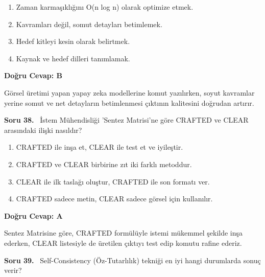 \documentclass[11pt,a4paper,openany]{book}
\begin{document}
\begin{enumerate}[label=\Alph*), leftmargin=25pt, topsep=4pt, itemsep=2pt]
        \item Zaman karmaşıklığını O(n log n) olarak optimize etmek.
        \item Kavramları değil, somut detayları betimlemek.
        \item Hedef kitleyi kesin olarak belirtmek.
        \item Kaynak ve hedef dilleri tanımlamak.
\end{enumerate}

\vspace{4pt}
\begin{tcolorbox}[title=Cevap ve Açıklama, colback=gray!3!white, colframe=primarycolor!90!black, arc=2mm, fonttitle=\bfseries\sffamily, top=6pt, bottom=6pt]
    \textbf{Doğru Cevap: B}

    \vspace{2pt}
    Görsel üretimi yapan yapay zeka modellerine komut yazılırken, soyut kavramlar yerine somut ve net detayların betimlenmesi çıktının kalitesini doğrudan artırır.
\end{tcolorbox}
\vspace{10pt}
\needspace{5cm}
\vspace{8pt}
\noindent\textbf{\large\sffamily Soru 38.} \ İstem Mühendisliği 'Sentez Matrisi'ne göre CRAFTED ve CLEAR arasındaki ilişki nasıldır?

\begin{enumerate}[label=\Alph*), leftmargin=25pt, topsep=4pt, itemsep=2pt]
        \item CRAFTED ile inşa et, CLEAR ile test et ve iyileştir.
        \item CRAFTED ve CLEAR birbirine zıt iki farklı metoddur.
        \item CLEAR ile ilk taslağı oluştur, CRAFTED ile son formatı ver.
        \item CRAFTED sadece metin, CLEAR sadece görsel için kullanılır.
\end{enumerate}

\vspace{4pt}
\begin{tcolorbox}[title=Cevap ve Açıklama, colback=gray!3!white, colframe=primarycolor!90!black, arc=2mm, fonttitle=\bfseries\sffamily, top=6pt, bottom=6pt]
    \textbf{Doğru Cevap: A}

    \vspace{2pt}
    Sentez Matrisine göre, CRAFTED formülüyle istemi mükemmel şekilde inşa ederken, CLEAR listesiyle de üretilen çıktıyı test edip komutu rafine ederiz.
\end{tcolorbox}
\vspace{10pt}
\needspace{5cm}
\vspace{8pt}
\noindent\textbf{\large\sffamily Soru 39.} \ Self-Consistency (Öz-Tutarlılık) tekniği en iyi hangi durumlarda sonuç verir?
\end{document}
